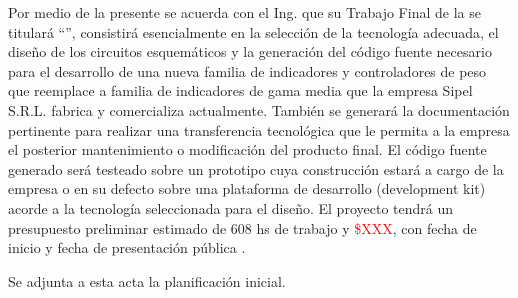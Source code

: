 \documentclass[11pt]{charter}
\begin{document}
Por medio de la presente se acuerda con el Ing. \authorname\hspace{1px} que su Trabajo Final de la \degreename\hspace{1px} se titulará ``\ttitle'', consistirá esencialmente en la selección de la tecnología adecuada, el diseño de los circuitos esquemáticos y la generación del código fuente necesario para el desarrollo de una nueva familia de indicadores y controladores de peso que reemplace a familia de indicadores de gama media que la empresa Sipel S.R.L. fabrica y comercializa actualmente. También se generará la documentación pertinente para realizar una transferencia tecnológica que le permita a la empresa el posterior mantenimiento o modificación del producto final. El código fuente generado será testeado sobre un prototipo cuya construcción estará a cargo de la empresa o en su defecto sobre una plataforma de desarrollo (development kit) acorde a la tecnología seleccionada para el diseño. El proyecto tendrá un presupuesto preliminar estimado de 608 hs de trabajo y \textcolor{red}{\$XXX}, con fecha de inicio \fechaInicioName\hspace{1px} y fecha de presentación pública \fechaFinalName.

Se adjunta a esta acta la planificación inicial.

\vfill
\end{document}
